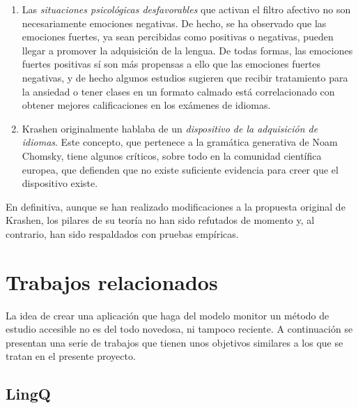 \begin{enumerate}
	\item Las \textit{situaciones psicológicas desfavorables} que activan el filtro afectivo no son necesariamente emociones negativas. De hecho, se ha observado que las emociones fuertes, ya sean percibidas como positivas o negativas, pueden llegar a promover la adquisición de la lengua. De todas formas, las emociones fuertes positivas sí son más propensas a ello que las emociones fuertes negativas, y de hecho algunos estudios sugieren que recibir tratamiento para la ansiedad o tener clases en un formato calmado está correlacionado con obtener mejores calificaciones en los exámenes de idiomas. 
	\item Krashen originalmente hablaba de un \textit{dispositivo de la adquisición de idiomas}. Este concepto, que pertenece a la gramática generativa de Noam Chomsky, tiene algunos críticos, sobre todo en la comunidad científica europea, que defienden que no existe suficiente evidencia para creer que el dispositivo existe. \todo[referencia]
\end{enumerate}



En definitiva, aunque se han realizado modificaciones a la propuesta original de Krashen, los pilares de su teoría no han sido refutados de momento y, al contrario, han sido respaldados con pruebas empíricas.



\section{Trabajos relacionados}

La idea de crear una aplicación que haga del modelo monitor un método de estudio accesible no es del todo novedosa, ni tampoco reciente. A continuación se presentan una serie de trabajos que tienen unos objetivos similares a los que se tratan en el presente proyecto.

\subsection{LingQ}

